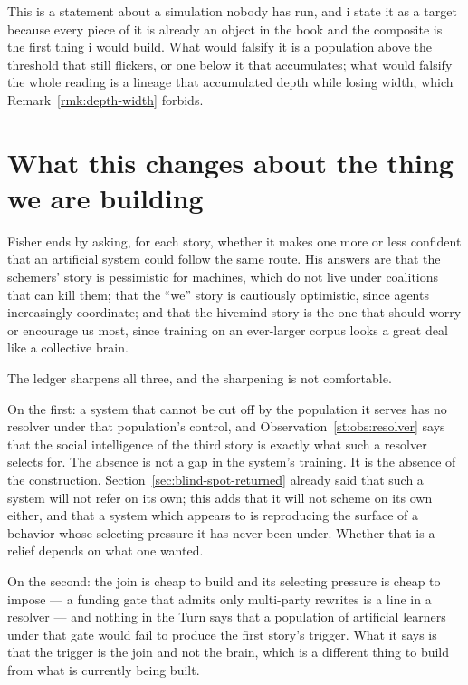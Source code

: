 \noindent
This is a statement about a simulation nobody has run, and i state it as a target because every piece of it is already an object in the book and the composite is the first thing i would build. What would falsify it is a population above the threshold that still flickers, or one below it that accumulates; what would falsify the whole reading is a lineage that accumulated depth while losing width, which Remark~\ref{rmk:depth-width} forbids.

\section{What this changes about the thing we are building}
\label{st:sec:ai}

Fisher ends by asking, for each story, whether it makes one more or less confident that an artificial system could follow the same route. His answers are that the schemers' story is pessimistic for machines, which do not live under coalitions that can kill them; that the ``we'' story is cautiously optimistic, since agents increasingly coordinate; and that the hivemind story is the one that should worry or encourage us most, since training on an ever-larger corpus looks a great deal like a collective brain.

The ledger sharpens all three, and the sharpening is not comfortable.

On the first: a system that cannot be cut off by the population it serves has no resolver under that population's control, and Observation~\ref{st:obs:resolver} says that the social intelligence of the third story is exactly what such a resolver selects for. The absence is not a gap in the system's training. It is the absence of the construction. Section~\ref{sec:blind-spot-returned} already said that such a system will not refer on its own; this adds that it will not scheme on its own either, and that a system which appears to is reproducing the surface of a behavior whose selecting pressure it has never been under. Whether that is a relief depends on what one wanted.

On the second: the join is cheap to build and its selecting pressure is cheap to impose --- a funding gate that admits only multi-party rewrites is a line in a resolver --- and nothing in the Turn says that a population of artificial learners under that gate would fail to produce the first story's trigger. What it says is that the trigger is the join and not the brain, which is a different thing to build from what is currently being built.


